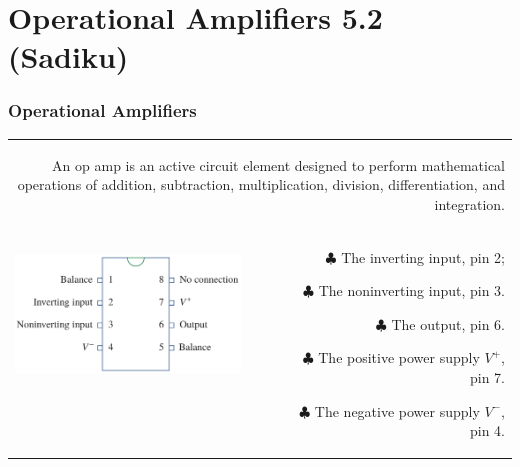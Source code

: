 \documentclass[aspectratio=169]{beamer}
\begin{document}
\section{Operational Amplifiers 5.2 (Sadiku)}
\begin{frame}[fragile]
\frametitle{Operational Amplifiers}
\begin{tabular}{r}
	\begin{columns}	\column{1\textwidth}
	An op amp is an active circuit element designed to perform mathematical operations of addition, subtraction, multiplication, division, differentiation, and integration.
\newline
	\end{columns} \\
	\begin{columns}
		\begin{column}{.5\textwidth}  %
			\includegraphics[height=3.5cm]{figura05.png}

		\end{column}
		\begin{column}{.6\textwidth}  %
		    \begin{itemize}
		    \item[$\clubsuit$]{The inverting input, pin 2;}
		    \item[$\clubsuit$]{The noninverting input, pin 3.}	
		    \item[$\clubsuit$]{The output, pin 6.}		
		    \item[$\clubsuit$]{The positive power supply $V^{+}$, pin 7.}	
		    \item[$\clubsuit$]{The negative power supply $V^{-}$, pin 4.}		
		  \end{itemize}
		\end{column}	
	\end{columns} \\
\end{tabular}
\end{frame}
\end{document}
